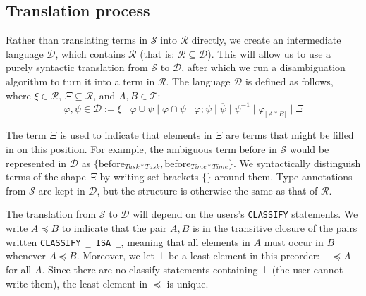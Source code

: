 \documentclass[12pt]{article}
\newcommand{\typetyped}[2]{{#1}_{\llbracket #2 \rrbracket}}
\newcommand{\conv}[1]{{#1}^{-1}}
\begin{document}
\subsection{Translation process}
Rather than translating terms in $\mathcal{S}$ into $\mathcal{R}$ directly, we create an intermediate language $\mathcal{D}$, which contains $\mathcal{R}$ (that is: $\mathcal{R} \subseteq \mathcal{D}$).
This will allow us to use a purely syntactic translation from $\mathcal{S}$ to $\mathcal{D}$, after which we run a disambiguation algorithm to turn it into a term in $\mathcal{R}$.
The language $\mathcal{D}$ is defined as follows, where $\xi \in \mathcal{R}$, $\Xi \subseteq \mathcal{R}$, and $A,B\in\mathcal{T}$:
\[
\varphi,\psi\in\mathcal{D} \mathbin{:=} \xi \mid \varphi \cup \psi \mid \varphi \cap \psi \mid \varphi ; \psi \mid \overline{\psi}\mid \conv{\psi} \mid \typetyped{\varphi}{A*B} \mid \Xi
\]

The term $\Xi$ is used to indicate that elements in $\Xi$ are terms that might be filled in on this position.
For example, the ambiguous term $\mathrm{before}$ in $\mathcal{S}$ would be represented in $\mathcal{D}$ as $\{\mathrm{before}_{Task*Task},\mathrm{before}_{Time*Time}\}$.
We syntactically distinguish terms of the shape $\Xi$ by writing set brackets $\{\}$ around them.
Type annotations from $\mathcal{S}$ are kept in $\mathcal{D}$, but the structure is otherwise the same as that of $\mathcal{R}$.

The translation from $\mathcal{S}$ to $\mathcal{D}$ will depend on the users's \verb=CLASSIFY= statements.
We write $A\preceq B$ to indicate that the pair $A,B$ is in the transitive closure of the pairs written \verb=CLASSIFY _ ISA _=, meaning that all elements in $A$ must occur in $B$ whenever $A\preceq B$.
Moreover, we let $\bot$ be a least element in this preorder: $\bot \preceq A$ for all $A$.
Since there are no classify statements containing $\bot$ (the user cannot write them), the least element in $\preceq$ is unique.
\end{document}
